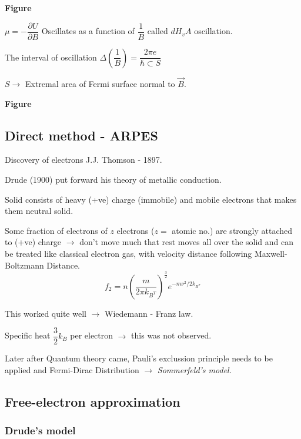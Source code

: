 \chapter[Lecture 25]{}\label{lec25}

\begin{center}
{\bf Figure}
\end{center}

$\mu=-\dfrac{\partial U}{\partial B}$ Oscillates as a function of $\dfrac{1}{B}$ called $dH_{v}A$ oscillation.

The interval of oscillation $\Delta\left(\dfrac{1}{B}\right)=\dfrac{2\pi e}{\hbar \subset S}$

$S\to$ Extremal area of Fermi surface normal to $\overrightarrow{B}$.
\begin{center}
{\bf Figure}
\end{center}

\section*{Direct method - ARPES}

Discovery of electrons J.J. Thomson - 1897.

Drude (1900) put forward his theory of metallic conduction.

Solid consists of heavy (+ve) charge (immobile) and mobile electrons that makes them neutral solid.

Some fraction of electrons of $z$ electrons ($z=$ atomic no.) are strongly attached to (+ve) charge $\to$ don't move much that rest moves all over the solid and can be treated like classical electron gas, with velocity distance following Maxwell- Boltzmann Distance.
$$
f_{2}=n\left(\dfrac{m}{2\pi k_{B^{T}}}\right)^{\frac{3}{2}}e^{-m\nu^{2}/2k_{B^{T}}}
$$

This worked quite well $\to$ Wiedemann - Franz law.

Specific heat $\dfrac{3}{2}k_{B}$ per electron $\to$ this was not observed.

Later after Quantum theory came, Pauli's exclussion principle needs to be applied and Fermi-Dirac Distribution $\to$ {\em Sommerfeld's model.}

\section*{Free-electron approximation}

\subsection*{Drude's model}

